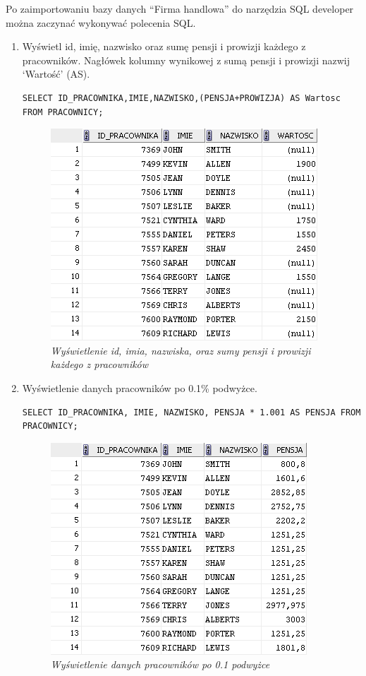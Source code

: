 \documentclass[a4paper, 10pt]{article}
\begin{document}
Po zaimportowaniu bazy danych ``Firma handlowa'' do narzędzia SQL developer można zaczynać  wykonywać polecenia SQL.

\begin{enumerate}

\item Wyświetl id, imię, nazwisko oraz sumę pensji i prowizji każdego z pracowników. Nagłówek kolumny wynikowej z sumą pensji i prowizji nazwij `Wartość' (AS). 

\begin{lstlisting}[style=SQL, caption=\textit{Wyświetlenie id, imia, nazwiska oraz sumy pensji i prowizji każdego z pracowników}]
SELECT ID_PRACOWNIKA,IMIE,NAZWISKO,(PENSJA+PROWIZJA) AS Wartosc FROM PRACOWNICY;
\end{lstlisting}

\begin{figure}[H]
	\centering
	\includegraphics[scale=0.7]{zadanie1.png}
	\caption{\textit{Wyświetlenie id, imia, nazwiska, oraz sumy pensji i prowizji każdego z pracowników}}
\end{figure}

\item Wyświetlenie danych pracowników po 0.1\% podwyżce.
\begin{lstlisting}[style=SQL, caption=\textit{Wyświetlenie danych pracowników po 0.1 podwyżce}]
SELECT ID_PRACOWNIKA, IMIE, NAZWISKO, PENSJA * 1.001 AS PENSJA FROM PRACOWNICY;
\end{lstlisting}

\begin{figure}[H]
	\centering
	\includegraphics[scale=0.7]{zadanie2.png}
	\caption{\textit{Wyświetlenie danych pracowników po 0.1 podwyżce}}
\end{figure}


\end{enumerate}
\end{document}
